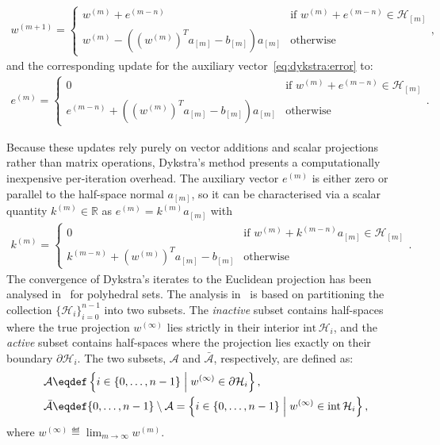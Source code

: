 \begin{align}\label{eq:dykstra:proj:poly}
w^{(m+1)}=
\begin{cases}
w^{(m)}+e^{(m-n)} & \text{if } w^{(m)}+e^{(m-n)}\in\mathcal{H}_{[m]}\\
w^{(m)} - \left((w^{(m)})^T a_{[m]} - b_{[m]}\right) a_{[m]} & \text{otherwise}
\end{cases},
\end{align}
and the corresponding update for the auxiliary vector~\eqref{eq:dykstra:error} to:
\begin{align}\label{eq:dykstra:error:poly}
e^{(m)}=
\begin{cases}
0 & \text{if } w^{(m)}+e^{(m-n)}\in\mathcal{H}_{[m]}\\
e^{(m-n)}+\left((w^{(m)})^T a_{[m]} - b_{[m]}\right) a_{[m]} & \text{otherwise}
\end{cases}.
\end{align}

Because these updates rely purely on vector additions and scalar projections rather than matrix operations, Dykstra's method presents a computationally inexpensive per-iteration overhead. The auxiliary vector $e^{(m)}$ is either zero or parallel to the half-space normal $a_{[m]}$, so it can be characterised via a scalar quantity $k^{(m)} \in \mathbb{R}$ as $e^{(m)} = k^{(m)} a_{[m]}$ with 
\begin{align}\label{eq:km}
k^{(m)} = 
\begin{cases}
0 & \text{if } w^{(m)} + k^{(m-n)}a_{[m]} \in \mathcal{H}_{[m]}\\
k^{(m-n)} + (w^{(m)})^T a_{[m]} - b_{[m]} & \text{otherwise}
\end{cases}.
\end{align}
The convergence of Dykstra's iterates to the Euclidean projection has been analysed in~\cite{DYKSTRAPERKINS,DYKSTRAPOLY,DYKSTRAPOLY2} for polyhedral sets. The analysis in~\cite{DYKSTRAPOLY} is based on partitioning the collection $\{\mathcal{H}_i\}_{i=0}^{n-1}$ into two subsets. The \emph{inactive} subset contains half-spaces where the true projection $w^{(\infty)}$ lies strictly in their interior $\text{int}\,\mathcal{H}_i$, and the \emph{active} subset contains half-spaces where the projection lies exactly on their boundary $\partial\mathcal{H}_i$. The two subsets, $\mathcal{A}$ and $\bar{\mathcal{A}}$, respectively, are defined as:
\begin{align}
\mathcal{A} &\eqdef \set{i \in \{ 0,\dots,n-1\}}{w^{(\infty)} \in \partial\mathcal{H}_i}, \\
\bar{\mathcal{A}} &\eqdef \{ 0,\dots,n-1\} \setminus \mathcal{A} = \set{i \in \{ 0,\dots,n-1\}}{w^{(\infty)} \in \text{int}\,\mathcal{H}_i},
\label{eq:active_inactive_sets}
\end{align}
where $w^{(\infty)} \eqdef \lim_{m \rightarrow \infty} w^{(m)}$. 

